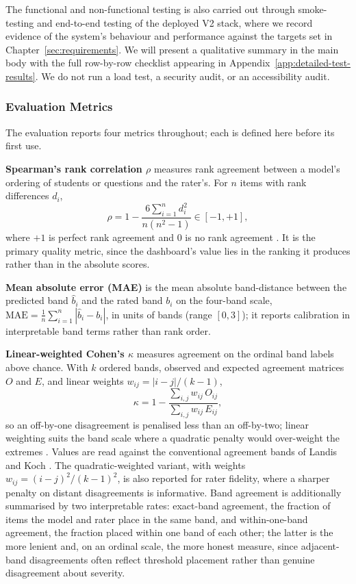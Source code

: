 The functional and non-functional testing is also carried out through smoke-testing and end-to-end testing of the deployed V2 stack, where we record evidence of the system's behaviour and performance against the targets set in Chapter~\ref{sec:requirements}.
We will present a qualitative summary in the main body with the full row-by-row checklist appearing in Appendix~\ref{app:detailed-test-results}. We do not run a load test, a security audit, or an accessibility audit.

\subsubsection{Evaluation Metrics} \label{sec:eval-metrics}
The evaluation reports four metrics throughout; each is defined here before its first use.

\textbf{Spearman's rank correlation $\rho$} measures rank agreement between a model's ordering of students or questions and the rater's. For $n$ items with rank differences $d_i$,
\begin{equation*}
    \rho = 1 - \frac{6\sum_{i=1}^{n} d_i^2}{n(n^2-1)} \in [-1,+1],
\end{equation*}
where $+1$ is perfect rank agreement and $0$ is no rank agreement \cite{spearmanProofMeasurementAssociation1904}. It is the primary quality metric, since the dashboard's value lies in the ranking it produces rather than in the absolute scores.

\textbf{Mean absolute error (MAE)} is the mean absolute band-distance between the predicted band $\hat{b}_i$ and the rated band $b_i$ on the four-band scale, $\mathrm{MAE} = \tfrac{1}{n}\sum_{i=1}^{n} |\hat{b}_i - b_i|$, in units of bands (range $[0,3]$); it reports calibration in interpretable band terms rather than rank order.

\textbf{Linear-weighted Cohen's $\kappa$} measures agreement on the ordinal band labels above chance. With $k$ ordered bands, observed and expected agreement matrices $O$ and $E$, and linear weights $w_{ij} = |i-j|/(k-1)$,
\begin{equation*}
    \kappa = 1 - \frac{\sum_{i,j} w_{ij}\,O_{ij}}{\sum_{i,j} w_{ij}\,E_{ij}},
\end{equation*}
so an off-by-one disagreement is penalised less than an off-by-two; linear weighting suits the band scale where a quadratic penalty would over-weight the extremes \cite{CoefficientAgreementNominal,cohenWeightedKappaNominal1968}. Values are read against the conventional agreement bands of Landis and Koch \cite{landisMeasurementObserverAgreement1977}. The quadratic-weighted variant, with weights $w_{ij} = (i-j)^2/(k-1)^2$, is also reported for rater fidelity, where a sharper penalty on distant disagreements is informative. Band agreement is additionally summarised by two interpretable rates: exact-band agreement, the fraction of items the model and rater place in the same band, and within-one-band agreement, the fraction placed within one band of each other; the latter is the more lenient and, on an ordinal scale, the more honest measure, since adjacent-band disagreements often reflect threshold placement rather than genuine disagreement about severity.


